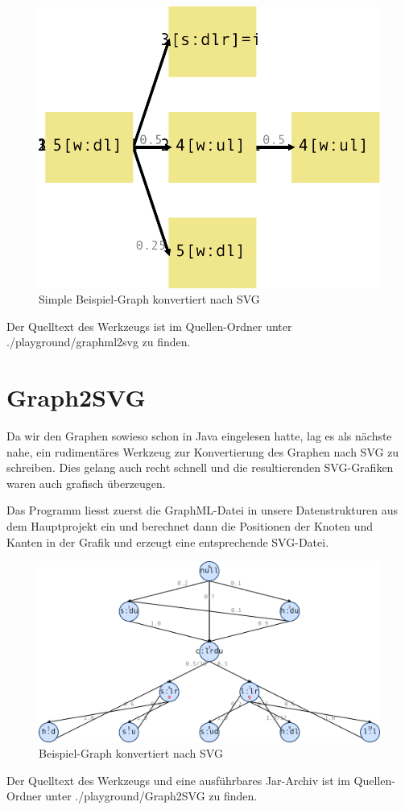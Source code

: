 \begin{figure}[h!]
   \centering
   \includegraphics[scale=0.3]{img/graphml2svg} 
   \caption{Simple Beispiel-Graph konvertiert nach SVG}
   \label{fig:graphml2svg}
\end{figure}

Der Quelltext des Werkzeugs ist im Quellen-Ordner unter ./playground/graphml2svg zu finden.

\section{Graph2SVG}

Da wir den Graphen sowieso schon in Java eingelesen hatte, lag es als nächste nahe, ein rudimentäres Werkzeug zur Konvertierung des Graphen nach SVG zu schreiben. Dies gelang auch recht schnell und die resultierenden SVG-Grafiken waren auch grafisch überzeugen.

Das Programm liesst zuerst die GraphML-Datei in unsere Datenstrukturen aus dem Hauptprojekt ein und berechnet dann die Positionen der Knoten und Kanten in der Grafik und erzeugt eine entsprechende SVG-Datei.

\begin{figure}[h!]
   \centering
   \includegraphics[width=\textwidth]{img/Graph2SVG} 
   \caption{Beispiel-Graph konvertiert nach SVG}
   \label{fig:graph2svg}
\end{figure}

Der Quelltext des Werkzeugs und eine ausführbares Jar-Archiv ist im Quellen-Ordner unter ./playground/Graph2SVG zu finden.
